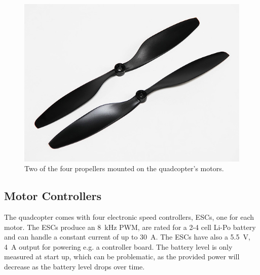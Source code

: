 \begin{figure}[H]
	\centering
	\includegraphics[scale=0.3]{figures/propeller.png}
	\caption{Two of the four propellers mounted on the quadcopter's motors.\cite{HkingPropeller}}
	\label{fig:Propeller}
\end{figure}



\subsection{Motor Controllers}\label{subsec:ESC}
The quadcopter comes with four electronic speed controllers, ESCs, one for each motor. The ESCs produce an \SI{8}{kHz} PWM, are rated for a 2-4 cell Li-Po battery and can handle a constant current of up to \SI{30}{A}. The ESCs have also a \SI{5.5}{V}, \SI{4}{A} output for powering e.g. a controller board. The battery level is only measured at start up, which can be problematic, as the provided power will decrease as the battery level drops over time. \cite{HKing}

